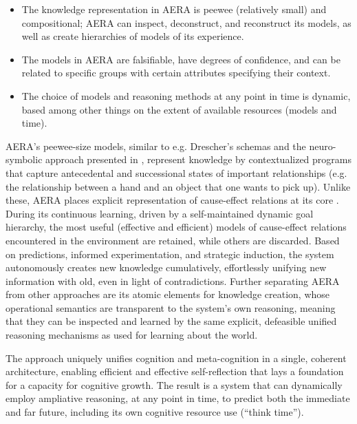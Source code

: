 \documentclass[runningheads]{llncs}
\begin{document}
\begin{itemize}
	\item The knowledge representation in AERA is peewee (relatively small) and compositional; AERA can inspect, deconstruct, and reconstruct its models, as well as create hierarchies of models of its experience.
	\item The models in AERA are falsifiable, have degrees of confidence, and can be related to specific groups with certain attributes specifying their context.
	\item The choice of models and reasoning methods at any point in time is dynamic, based among other things on the extent of available resources (models and time).
	
\end{itemize}



AERA’s peewee-size models, similar to e.g. Drescher’s \cite{drescher_made-up_1991} schemas and the neuro-symbolic approach presented in \cite{komrusch_symbolic_2022}, represent knowledge by contextualized programs that capture antecedental and successional states of important relationships (e.g. the relationship between a hand and an object that one wants to pick up). Unlike these, AERA places explicit representation of cause-effect relations at its core \cite{thorisson2018cumulative}. During its continuous learning, driven by a self-maintained dynamic goal hierarchy, the most useful (effective and efficient) models of cause-effect relations encountered in the environment are retained, while others are discarded. Based on predictions, informed experimentation, and strategic induction, the system autonomously creates new knowledge cumulatively, effortlessly unifying new information with old, even in light of contradictions. Further separating AERA from other approaches are its atomic elements for knowledge creation, whose operational semantics are transparent to the system’s own reasoning, meaning that they can be inspected and learned by the same explicit, defeasible unified reasoning mechanisms as used for learning about the world. 

The approach uniquely unifies cognition and meta-cognition in a single, coherent architecture, enabling efficient and effective self-reflection that lays a foundation for a capacity for cognitive growth. The result is a system that can dynamically employ ampliative reasoning, at any point in time, to predict both the immediate and far future, including its own cognitive resource use (“think time”). 
\end{document}
